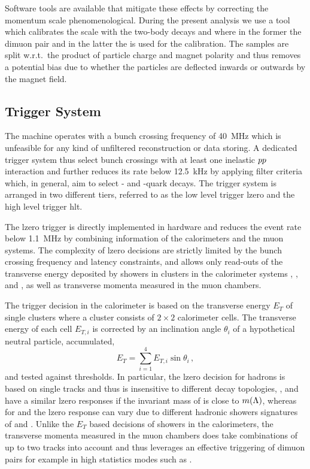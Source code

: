 Software tools are available that mitigate these effects by correcting the momentum scale phenomenological.
During the present analysis we use a tool which calibrates the scale with the two-body decays \decay{\jpsi}{\mup\mun} and \decay{\Bd}{\jpsi\Kp} where in the former the dimuon pair and in the latter the \Kp is used for the calibration.
The samples are split w.r.t.\ the product of particle charge and magnet polarity and thus removes a potential bias due to whether the particles are deflected inwards or outwards by the magnet field.

\subsection{Trigger System}
\label{sec:detector_trigger}
The \lhc machine operates with a bunch crossing frequency of \SI{40}{\mega\hertz} which is unfeasible for any kind of unfiltered reconstruction or data storing.
A dedicated trigger system thus select bunch crossings with at least one inelastic ${p}{p}$ interaction and further reduces its rate below \SI{12.5}{\kilo\hertz} by applying filter criteria which, in general, aim to select \bquark- and \cquark-quark decays.
The trigger system is arranged in two different tiers, referred to as the low level trigger \gls{lzero} and the high level trigger \gls{hlt}.

The \gls{lzero} trigger is directly implemented in hardware and reduces the event rate below \SI{1.1}{\mega\hertz} by combining information of the calorimeters and the muon systems.
The complexity of \gls{lzero} decisions are strictly limited by the \lhc bunch crossing frequency and latency constraints, and allows only read-outs of the transverse energy deposited by showers in clusters in the calorimeter systems \spd, \presh, \ecal and \hcal, as well as transverse momenta measured in the muon chambers.

The trigger decision in the calorimeter is based on the transverse energy $E_T$ of single clusters where a cluster consists of $2 \times 2$ calorimeter cells.
The transverse energy of each cell $E_{T,i}$ is corrected by an inclination angle $\theta_i$ of a hypothetical neutral particle, accumulated,
\begin{equation*}
    E_T = \sum_{i=1}^4 E_{T,i} \sin \theta_i \,,
\end{equation*}
and tested against thresholds.
In particular, the \gls{lzero} decision for hadrons is based on single tracks and thus is insensitive to different decay topologies, \eg{}, \decay{\Lb}{\Dz\proton\pim} and \decay{\Lb}{\Dz(\decay{\Lz}{\proton\pim})} have a similar \gls{lzero} responses if the invariant mass of \proton \pim is close to $m({\Lambda})$, whereas for \decay{\Lb}{\Dz\proton\pim} and \decay{\Lb}{\Dz\proton\Km} the \gls{lzero} response can vary due to different hadronic showers signatures of \pim and \Km.
Unlike the $E_T$ based decisions of showers in the calorimeters, the transverse momenta measured in the muon chambers does take combinations of up to two tracks into account and thus leverages an effective triggering of dimuon pairs for example in high statistics modes such as \decay{\Lb}{\jpsi\Lz}.

